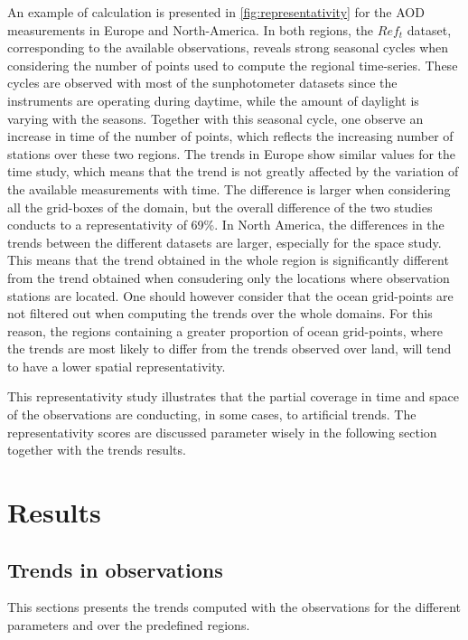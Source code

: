 \documentclass[journal abbreviation, manuscript]{copernicus}
\begin{document}
An example of calculation is presented in \ref{fig:representativity} for the AOD measurements in Europe and North-America. In both regions, the $Ref_{t}$ dataset, corresponding to the available observations, reveals strong seasonal cycles when considering the number of points used to compute the regional time-series. These cycles are observed with most of the sunphotometer datasets since the instruments are operating during daytime, while the amount of daylight is varying with the seasons. Together with this seasonal cycle, one observe an increase in time of the number of points, which reflects the increasing number of stations over these two regions. The trends in Europe show similar values for the time study, which means that the trend is not greatly affected by the variation of the available measurements with time. The difference is larger when considering all the grid-boxes of the domain, but the overall difference of the two studies conducts to a representativity of 69\%. In North America, the differences in the trends between the different datasets are larger, especially for the space study. This means that the trend obtained in the whole region is significantly different from the trend obtained when consudering only the locations where observation stations are located. One should however consider that the ocean grid-points are not filtered out when computing the trends over the whole domains. For this reason, the regions containing a greater proportion of ocean grid-points, where the trends are most likely to differ from the trends observed over land, will tend to have a lower spatial representativity.

This representativity study illustrates that the partial coverage in time and space of the observations are conducting, in some cases, to artificial trends. The representativity scores are discussed parameter wisely in the following section together with the trends results.

\section{Results}

\subsection{Trends in observations}
This sections presents the trends computed with the observations for the different parameters and over the predefined regions.
\end{document}
